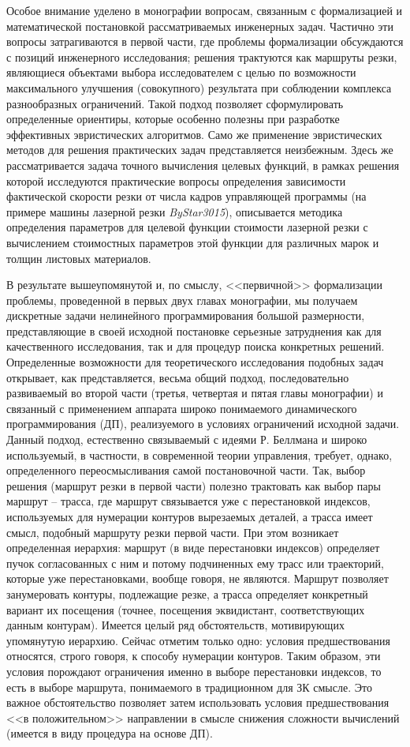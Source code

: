 \documentclass[11pt,twoside,openany]{report}
\begin{document}
Особое внимание уделено в монографии вопросам,
связанным с формализацией и математической постановкой
рассматриваемых инженерных задач.
Частично эти вопросы затрагиваются в первой части,
где проблемы формализации обсуждаются с позиций инженерного исследования;
решения трактуются как маршруты резки,
являющиеся объектами выбора исследователем с целью
по возможности максимального улучшения (совокупного)
результата при соблюдении комплекса разнообразных ограничений.
Такой подход позволяет сформулировать определенные ориентиры,
которые особенно полезны при разработке эффективных эвристических алгоритмов.
Само же применение эвристических методов для решения
практических задач представляется неизбежным.
Здесь же рассматривается задача точного вычисления целевых функций,
в рамках решения которой исследуются практические
вопросы определения зависимости фактической скорости резки
от числа кадров управляющей программы
(на примере машины лазерной резки
\textit{ByStar3015}),
описывается методика определения параметров
для целевой функции стоимости лазерной резки
с вычислением стоимостных параметров этой функции
для различных марок и толщин листовых материалов.

В результате вышеупомянутой и,
по смыслу, <<первичной>> формализации проблемы,
проведенной в первых двух главах монографии,
мы получаем дискретные задачи нелинейного программирования
большой размерности, представляющие в своей исходной постановке
серьезные затруднения как для качественного исследования,
так и для процедур поиска конкретных решений.
Определенные возможности для теоретического исследования
подобных задач открывает,
как представляется, весьма общий подход,
последовательно развиваемый во второй части
(третья, четвертая и пятая главы монографии)
и связанный с применением аппарата широко понимаемого
динамического программирования (ДП),
реализуемого в условиях ограничений исходной задачи.
Данный подход, естественно связываемый с идеями
Р. Беллмана и широко используемый, в частности,
в современной теории управления, требует, однако,
определенного переосмысливания самой постановочной части.
Так, выбор решения (маршрут резки в первой части)
полезно трактовать как выбор пары маршрут -- трасса,
где маршрут связывается уже с перестановкой индексов,
используемых для нумерации контуров вырезаемых деталей,
а трасса имеет смысл, подобный маршруту резки первой части.
При этом возникает определенная иерархия:
маршрут (в виде перестановки индексов)
определяет пучок согласованных с ним и
потому подчиненных ему трасс или траекторий,
которые уже перестановками, вообще говоря, не являются.
Маршрут позволяет занумеровать контуры, подлежащие резке,
а трасса определяет конкретный вариант их посещения
(точнее, посещения эквидистант, соответствующих данным контурам).
Имеется целый ряд обстоятельств, мотивирующих упомянутую иерархию.
Сейчас отметим только одно:
условия предшествования относятся,
строго говоря, к способу нумерации контуров.
Таким образом, эти условия порождают ограничения
именно в выборе перестановки индексов,
то есть в выборе маршрута, понимаемого в традиционном для ЗК смысле.
Это важное обстоятельство позволяет затем
использовать условия предшествования <<в положительном>>
направлении в смысле снижения сложности вычислений
(имеется в виду процедура на основе ДП).
\end{document}
